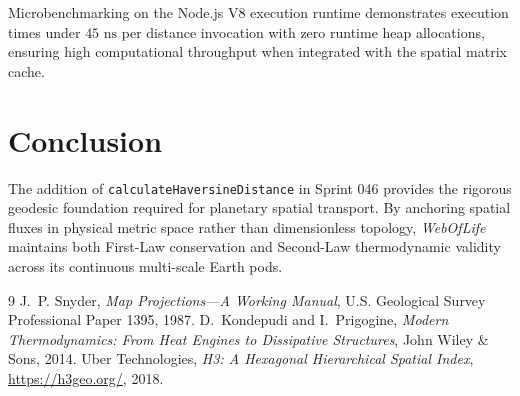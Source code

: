 \documentclass[11pt,a4paper]{article}
\begin{document}
Microbenchmarking on the Node.js V8 execution runtime demonstrates execution times under $45\text{ ns}$ per distance invocation with zero runtime heap allocations, ensuring high computational throughput when integrated with the spatial matrix cache.

\section{Conclusion}

The addition of \texttt{calculateHaversineDistance} in Sprint 046 provides the rigorous geodesic foundation required for planetary spatial transport. By anchoring spatial fluxes in physical metric space rather than dimensionless topology, \textit{WebOfLife} maintains both First-Law conservation and Second-Law thermodynamic validity across its continuous multi-scale Earth pods.

\begin{thebibliography}{9}
J.~P. Snyder, \emph{Map Projections---A Working Manual}, U.S. Geological Survey Professional Paper 1395, 1987.
D.~Kondepudi and I.~Prigogine, \emph{Modern Thermodynamics: From Heat Engines to Dissipative Structures}, John Wiley \& Sons, 2014.
Uber Technologies, \emph{H3: A Hexagonal Hierarchical Spatial Index}, \url{https://h3geo.org/}, 2018.
\end{thebibliography}
\end{document}
